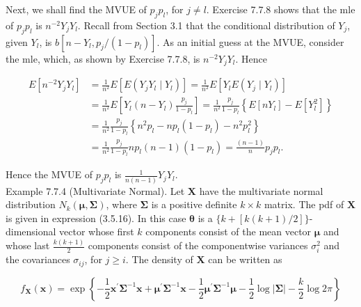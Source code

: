 Next, we shall find the MVUE of $p_{j} p_{l}$, for $j \neq l$. Exercise 7.7.8 shows that the mle of $p_{j} p_{l}$ is $n^{-2} Y_{j} Y_{l}$. Recall from Section 3.1 that the conditional distribution of $Y_{j}$, given $Y_{l}$, is $b\left[n-Y_{l}, p_{j} /\left(1-p_{l}\right)\right]$. As an initial guess at the MVUE, consider the mle, which, as shown by Exercise 7.7.8, is $n^{-2} Y_{j} Y_{l}$. Hence

$$
\begin{aligned}
E\left[n^{-2} Y_{j} Y_{l}\right] & =\frac{1}{n^{2}} E\left[E\left(Y_{j} Y_{l} \mid Y_{l}\right)\right]=\frac{1}{n^{2}} E\left[Y_{l} E\left(Y_{j} \mid Y_{l}\right)\right] \\
& =\frac{1}{n^{2}} E\left[Y_{l}\left(n-Y_{l}\right) \frac{p_{j}}{1-p_{l}}\right]=\frac{1}{n^{2}} \frac{p_{j}}{1-p_{l}}\left\{E\left[n Y_{l}\right]-E\left[Y_{l}^{2}\right]\right\} \\
& =\frac{1}{n^{2}} \frac{p_{j}}{1-p_{l}}\left\{n^{2} p_{l}-n p_{l}\left(1-p_{l}\right)-n^{2} p_{l}^{2}\right\} \\
& =\frac{1}{n^{2}} \frac{p_{j}}{1-p_{l}} n p_{l}(n-1)\left(1-p_{l}\right)=\frac{(n-1)}{n} p_{j} p_{l} .
\end{aligned}
$$

Hence the MVUE of $p_{j} p_{l}$ is $\frac{1}{n(n-1)} Y_{j} Y_{l}$.\\
Example 7.7.4 (Multivariate Normal). Let $\mathbf{X}$ have the multivariate normal distribution $N_{k}(\boldsymbol{\mu}, \boldsymbol{\Sigma})$, where $\boldsymbol{\Sigma}$ is a positive definite $k \times k$ matrix. The pdf of $\mathbf{X}$ is given in expression (3.5.16). In this case $\boldsymbol{\theta}$ is a $\{k+[k(k+1) / 2]\}$-dimensional vector whose first $k$ components consist of the mean vector $\boldsymbol{\mu}$ and whose last $\frac{k(k+1)}{2}$ components consist of the componentwise variances $\sigma_{i}^{2}$ and the covariances $\sigma_{i j}$, for $j \geq i$. The density of $\mathbf{X}$ can be written as


\begin{equation*}
f_{\mathbf{X}}(\mathbf{x})=\exp \left\{-\frac{1}{2} \mathbf{x}^{\prime} \boldsymbol{\Sigma}^{-1} \mathbf{x}+\boldsymbol{\mu}^{\prime} \boldsymbol{\Sigma}^{-1} \mathbf{x}-\frac{1}{2} \boldsymbol{\mu}^{\prime} \boldsymbol{\Sigma}^{-1} \boldsymbol{\mu}-\frac{1}{2} \log |\boldsymbol{\Sigma}|-\frac{k}{2} \log 2 \pi\right\} \tag{7.7.7}
\end{equation*}


